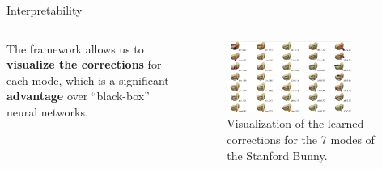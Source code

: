 \documentclass[9pt]{beamer}
\begin{document}
\begin{frame}{Interpretability}
    \begin{columns}[T]
        \begin{column}{0.3\textwidth}
            \vspace{3em}
   The framework allows us to \textbf{visualize the corrections} for each mode, which is a significant \textbf{advantage} over ``black-box'' neural networks.
        \end{column}
        \begin{column}{0.7\textwidth}
            \begin{figure}
                \includegraphics[width=0.8\textwidth]{Images/latent_space_viz.png}
                \caption{Visualization of the learned corrections for the 7 modes of the Stanford Bunny.}
            \end{figure}
        \end{column}
    \end{columns}
\end{frame}
\end{document}
